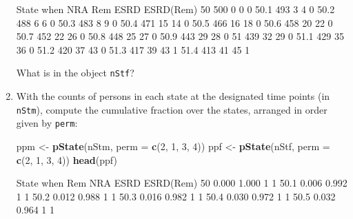 \documentclass[
]{book}
\newenvironment{Shaded}{\begin{snugshade}}{\end{snugshade}}
\newcommand{\AttributeTok}[1]{\textcolor[rgb]{0.13,0.29,0.53}{#1}}
\newcommand{\DecValTok}[1]{\textcolor[rgb]{0.00,0.00,0.81}{#1}}
\newcommand{\FunctionTok}[1]{\textcolor[rgb]{0.13,0.29,0.53}{\textbf{#1}}}
\newcommand{\NormalTok}[1]{#1}
\newcommand{\OtherTok}[1]{\textcolor[rgb]{0.56,0.35,0.01}{#1}}
\begin{document}
\begin{enumerate}
\begin{Shaded}
\begin{Highlighting}[]
\NormalTok{      State}
\NormalTok{when   NRA Rem ESRD ESRD(Rem)}
\NormalTok{  50   500   0    0         0}
\NormalTok{  50.1 493   3    4         0}
\NormalTok{  50.2 488   6    6         0}
\NormalTok{  50.3 483   8    9         0}
\NormalTok{  50.4 471  15   14         0}
\NormalTok{  50.5 466  16   18         0}
\NormalTok{  50.6 458  20   22         0}
\NormalTok{  50.7 452  22   26         0}
\NormalTok{  50.8 448  25   27         0}
\NormalTok{  50.9 443  29   28         0}
\NormalTok{  51   439  32   29         0}
\NormalTok{  51.1 429  35   36         0}
\NormalTok{  51.2 420  37   43         0}
\NormalTok{  51.3 417  39   43         1}
\NormalTok{  51.4 413  41   45         1}
\end{Highlighting}
\end{Shaded}

  What is in the object \texttt{nStf}?
\item
  With the counts of persons in each state at the
  designated time points (in \texttt{nStm}), compute the cumulative
  fraction over the states, arranged in order given by \texttt{perm}:

\begin{Shaded}
\begin{Highlighting}[]
\NormalTok{ppm }\OtherTok{\textless{}{-}} \FunctionTok{pState}\NormalTok{(nStm, }\AttributeTok{perm =} \FunctionTok{c}\NormalTok{(}\DecValTok{2}\NormalTok{, }\DecValTok{1}\NormalTok{, }\DecValTok{3}\NormalTok{, }\DecValTok{4}\NormalTok{))}
\NormalTok{ppf }\OtherTok{\textless{}{-}} \FunctionTok{pState}\NormalTok{(nStf, }\AttributeTok{perm =} \FunctionTok{c}\NormalTok{(}\DecValTok{2}\NormalTok{, }\DecValTok{1}\NormalTok{, }\DecValTok{3}\NormalTok{, }\DecValTok{4}\NormalTok{))}
\FunctionTok{head}\NormalTok{(ppf)}
\end{Highlighting}
\end{Shaded}

\begin{Shaded}
\begin{Highlighting}[]
\NormalTok{      State}
\NormalTok{when     Rem   NRA ESRD ESRD(Rem)}
\NormalTok{  50   0.000 1.000    1         1}
\NormalTok{  50.1 0.006 0.992    1         1}
\NormalTok{  50.2 0.012 0.988    1         1}
\NormalTok{  50.3 0.016 0.982    1         1}
\NormalTok{  50.4 0.030 0.972    1         1}
\NormalTok{  50.5 0.032 0.964    1         1}
\end{Highlighting}
\end{Shaded}


\end{enumerate}
\end{document}
